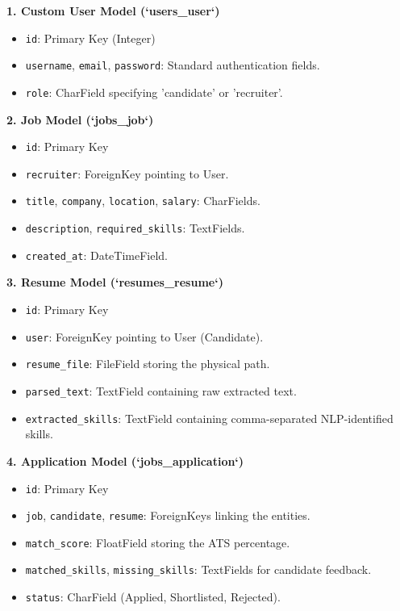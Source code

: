 \documentclass[12pt,a4paper]{report}
\begin{document}
\textbf{1. Custom User Model (`users_user`)}
\begin{itemize}
\item \texttt{id}: Primary Key (Integer)
\item \texttt{username}, \texttt{email}, \texttt{password}: Standard authentication fields.
\item \texttt{role}: CharField specifying 'candidate' or 'recruiter'.
\end{itemize}

\textbf{2. Job Model (`jobs_job`)}
\begin{itemize}
\item \texttt{id}: Primary Key
\item \texttt{recruiter}: ForeignKey pointing to User.
\item \texttt{title}, \texttt{company}, \texttt{location}, \texttt{salary}: CharFields.
\item \texttt{description}, \texttt{required\_skills}: TextFields.
\item \texttt{created\_at}: DateTimeField.
\end{itemize}

\textbf{3. Resume Model (`resumes_resume`)}
\begin{itemize}
\item \texttt{id}: Primary Key
\item \texttt{user}: ForeignKey pointing to User (Candidate).
\item \texttt{resume\_file}: FileField storing the physical path.
\item \texttt{parsed\_text}: TextField containing raw extracted text.
\item \texttt{extracted\_skills}: TextField containing comma-separated NLP-identified skills.
\end{itemize}

\textbf{4. Application Model (`jobs_application`)}
\begin{itemize}
\item \texttt{id}: Primary Key
\item \texttt{job}, \texttt{candidate}, \texttt{resume}: ForeignKeys linking the entities.
\item \texttt{match\_score}: FloatField storing the ATS percentage.
\item \texttt{matched\_skills}, \texttt{missing\_skills}: TextFields for candidate feedback.
\item \texttt{status}: CharField (Applied, Shortlisted, Rejected).
\end{itemize}
\end{document}
